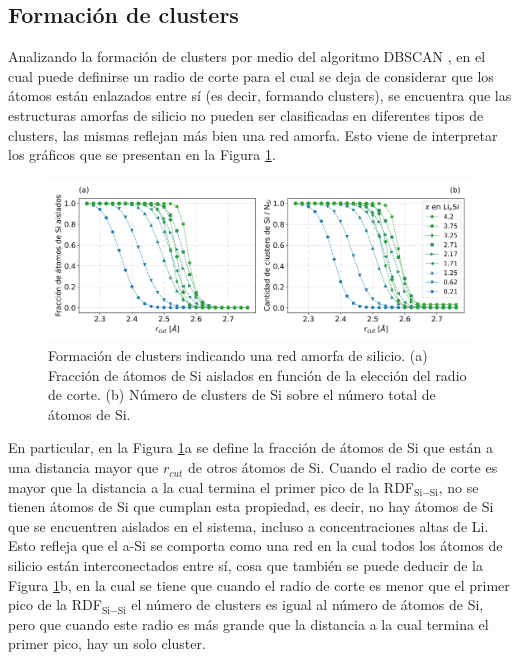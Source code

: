 \subsection{Formación de clusters}\label{s:clusters}

Analizando la formación de clusters por medio del algoritmo DBSCAN 
\cite{ester1996}, en el cual puede definirse un radio de corte para el cual se 
deja de considerar que los átomos están enlazados entre sí (es decir, formando 
clusters), se encuentra que las estructuras amorfas de silicio no pueden ser 
clasificadas en diferentes tipos de clusters, las mismas reflejan más bien 
una red amorfa. Esto viene de interpretar los gráficos que se presentan en la 
Figura \ref{fig:clusters}. 
\begin{figure}[h!]
    \centering
    \includegraphics[width=\textwidth]{Silicio/caracterizacion/resultados/clusters/clusters.png}
    \caption{Formación de clusters indicando una red amorfa de silicio. (a) 
    Fracción de átomos de Si aislados en función de la elección del
    radio de corte. (b) Número de clusters de Si sobre el número total de átomos 
    de Si.}
    \label{fig:clusters}
\end{figure}

En particular, en la Figura \ref{fig:clusters}a se define la fracción 
de átomos de Si que están a una distancia mayor que $r_{cut}$ de otros átomos de 
Si. Cuando el radio de corte es mayor que la distancia a la cual termina el 
primer pico de la RDF$_{\text{Si}-\text{Si}}$, no se tienen átomos de Si que cumplan esta 
propiedad, es decir, no hay átomos de Si que se encuentren aislados en el sistema,
incluso a concentraciones altas de Li. Esto refleja que el a-Si se comporta como 
una red en la cual todos los átomos de silicio están interconectados entre sí, 
cosa que también se puede deducir de la Figura \ref{fig:clusters}b, en la cual 
se tiene que cuando el radio de corte es menor que el primer pico de la RDF$_{\text{Si}-\text{Si}}$ 
el número de clusters es igual al número de átomos de Si, pero que cuando este 
radio es más grande que la distancia a la cual termina el primer pico, hay un 
solo cluster.
